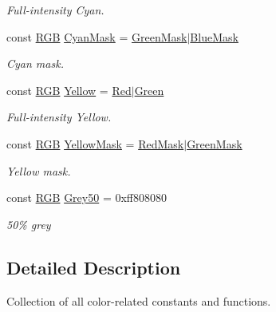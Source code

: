 \begin{DoxyCompactItemize}
\begin{DoxyCompactList}\small\item\em Full-\/intensity Cyan. \end{DoxyCompactList}\item 
\hypertarget{namespaceGUI_1_1Color_ad233d44685af13a03c83b1961c34faac}{const \hyperlink{namespaceGUI_aeafd135255365f3584da0e982fc79466}{R\-G\-B} \hyperlink{namespaceGUI_1_1Color_ad233d44685af13a03c83b1961c34faac}{Cyan\-Mask} = \hyperlink{namespaceGUI_1_1Color_a37d5ca764bcbe72a6ed40e1da616ed14}{Green\-Mask}$|$\hyperlink{namespaceGUI_1_1Color_a1a7b369a341d09a8169b0cee7dd84133}{Blue\-Mask}}\label{namespaceGUI_1_1Color_ad233d44685af13a03c83b1961c34faac}

\begin{DoxyCompactList}\small\item\em Cyan mask. \end{DoxyCompactList}\item 
\hypertarget{namespaceGUI_1_1Color_a815c879bb314db89c874f7f83a019dea}{const \hyperlink{namespaceGUI_aeafd135255365f3584da0e982fc79466}{R\-G\-B} \hyperlink{namespaceGUI_1_1Color_a815c879bb314db89c874f7f83a019dea}{Yellow} = \hyperlink{namespaceGUI_1_1Color_afd75fd1adfed0ee6c8a9d0b6dae17067}{Red}$|$\hyperlink{namespaceGUI_1_1Color_abd1f60be48e0a52e65f77405e024ecf0}{Green}}\label{namespaceGUI_1_1Color_a815c879bb314db89c874f7f83a019dea}

\begin{DoxyCompactList}\small\item\em Full-\/intensity Yellow. \end{DoxyCompactList}\item 
\hypertarget{namespaceGUI_1_1Color_a6736b5c88370e3e99dd48702bb1ee90d}{const \hyperlink{namespaceGUI_aeafd135255365f3584da0e982fc79466}{R\-G\-B} \hyperlink{namespaceGUI_1_1Color_a6736b5c88370e3e99dd48702bb1ee90d}{Yellow\-Mask} = \hyperlink{namespaceGUI_1_1Color_a956f63d5af7b9da4fabc98dd25739097}{Red\-Mask}$|$\hyperlink{namespaceGUI_1_1Color_a37d5ca764bcbe72a6ed40e1da616ed14}{Green\-Mask}}\label{namespaceGUI_1_1Color_a6736b5c88370e3e99dd48702bb1ee90d}

\begin{DoxyCompactList}\small\item\em Yellow mask. \end{DoxyCompactList}\item 
\hypertarget{namespaceGUI_1_1Color_a58c34a779d4e96011115e6715156700e}{const \hyperlink{namespaceGUI_aeafd135255365f3584da0e982fc79466}{R\-G\-B} \hyperlink{namespaceGUI_1_1Color_a58c34a779d4e96011115e6715156700e}{Grey50} = 0xff808080}\label{namespaceGUI_1_1Color_a58c34a779d4e96011115e6715156700e}

\begin{DoxyCompactList}\small\item\em 50\% grey \end{DoxyCompactList}\end{DoxyCompactItemize}


\subsection{Detailed Description}
Collection of all color-\/related constants and functions. 